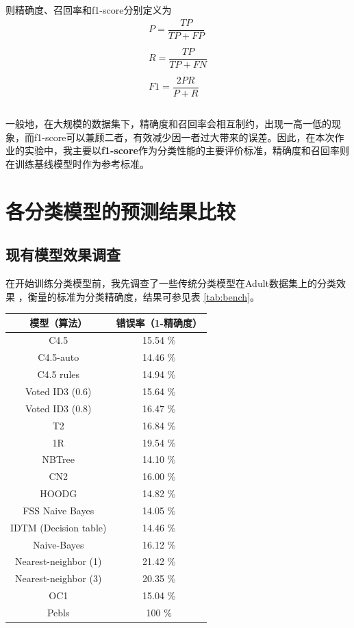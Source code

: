 \documentclass[12pt,a4paper]{article}
\theoremstyle{definition}
\begin{document}
{则精确度、召回率和f1-score分别定义为
\begin{equation}
	\begin{aligned}
	P = \dfrac{TP}{TP + FP} \\ \\
	R = \dfrac{TP}{TP + FN} \\ \\
	F1 = \dfrac{2PR}{P + R} \\ \\
	\end{aligned}
\end{equation}

\vspace{-0.03\linewidth}
一般地，在大规模的数据集下，精确度和召回率会相互制约，出现一高一低的现象，而f1-score可以兼顾二者，有效减少因一者过大带来的误差。因此，在本次作业的实验中，我主要以\textbf{f1-score}作为分类性能的主要评价标准，精确度和召回率则在训练基线模型时作为参考标准。

\section{各分类模型的预测结果比较}
\label{sec:model-single}

\subsection{现有模型效果调查}

在开始训练分类模型前，我先调查了一些传统分类模型在Adult数据集上的分类效果 \cite{bench}，衡量的标准为分类精确度，结果可参见表 \ref{tab:bench}。

\begin{table}[H]
	\centering
	\begin{tabular}{c|c}
		模型（算法） & 错误率（1-精确度） \\
		\hline
		\hline
	
		C4.5 & 15.54 \% \\
		C4.5-auto & 14.46 \% \\
		C4.5 rules & 14.94 \% \\
		Voted ID3 (0.6) & 15.64 \% \\
		Voted ID3 (0.8) & 16.47 \% \\
		T2 & 16.84 \% \\
		1R & 19.54 \% \\
		NBTree & 14.10 \% \\
		CN2 & 16.00 \% \\
		HOODG & 14.82 \% \\
		FSS Naive Bayes & 14.05 \% \\
		IDTM (Decision table) & 14.46 \% \\
		Naive-Bayes & 16.12 \% \\
		Nearest-neighbor (1) & 21.42 \% \\
		Nearest-neighbor (3) & 20.35 \% \\
		OC1 & 15.04 \% \\
		Pebls & 100 \% \\
		

\end{tabular}
\end{table}}
\end{document}
